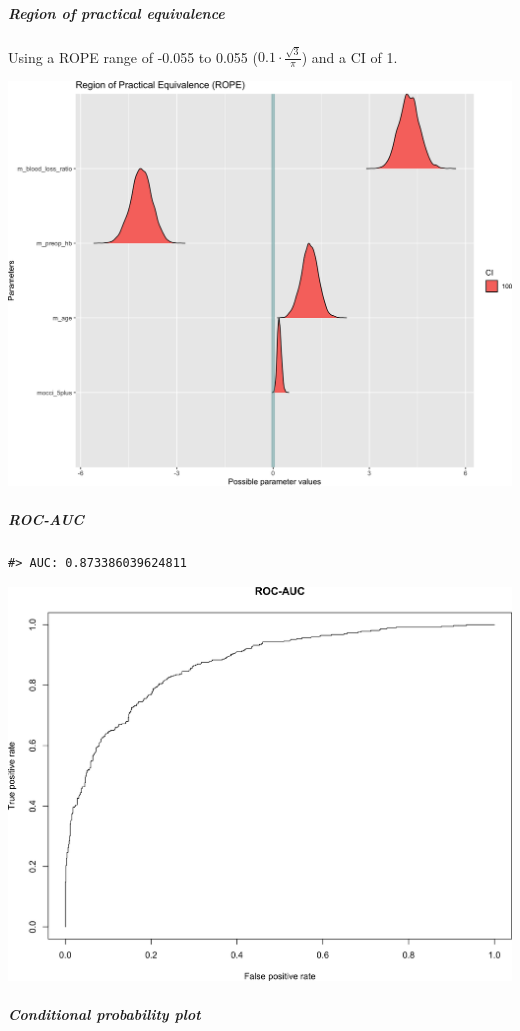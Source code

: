 \documentclass[
]{article}
\begin{document}
\hypertarget{region-of-practical-equivalence-1}{%
\subparagraph{Region of practical equivalence}\label{region-of-practical-equivalence-1}}

Using a ROPE range of -0.055 to 0.055 (\(0.1 \cdot \frac{\sqrt{3}}{\pi}\)) and a CI of 1.

\begin{center}\includegraphics[width=1\linewidth]{notebook_files/figure-latex/model1reduced_rope-1} \end{center}

\hypertarget{roc-auc-1}{%
\subparagraph{ROC-AUC}\label{roc-auc-1}}

\begin{verbatim}
#> AUC: 0.873386039624811
\end{verbatim}

\begin{center}\includegraphics[width=1\linewidth]{notebook_files/figure-latex/model1reduced_rocauc-1} \end{center}

\hypertarget{conditional-probability-plot-1}{%
\subparagraph{Conditional probability plot}\label{conditional-probability-plot-1}}
\end{document}
